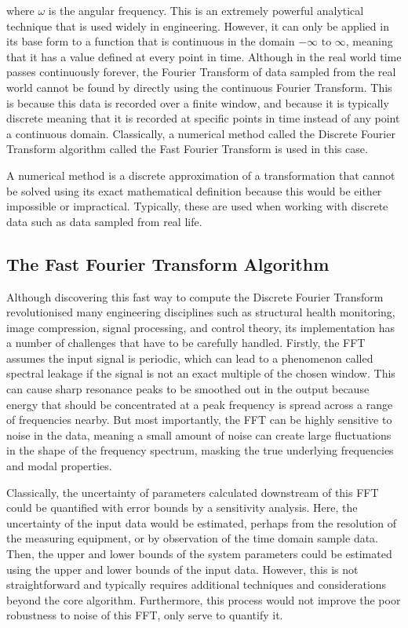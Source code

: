 \documentclass[12pt]{article}
\begin{document}
    where $\omega$ is the angular frequency.
    This is an extremely powerful analytical technique that is used widely in engineering.
    However, it can only be applied in its base form to a function that is continuous in the domain $-\infty \text{ to } \infty$, meaning that it has a value defined at every point in time.
    Although in the real world time passes continuously forever, the Fourier Transform of data sampled from the real world cannot be found by directly using the continuous Fourier Transform.
    This is because this data is recorded over a finite window, and because it is typically discrete meaning that it is recorded at specific points in time instead of any point a continuous domain.
    Classically, a numerical method called the Discrete Fourier Transform algorithm called the Fast Fourier Transform is used in this case.

    A numerical method is a discrete approximation of a transformation that cannot be solved using its exact mathematical definition because this would be either impossible or impractical.
    Typically, these are used when working with discrete data such as data sampled from real life.

    \subsection{The Fast Fourier Transform Algorithm}
    Although discovering this fast way to compute the Discrete Fourier Transform revolutionised many engineering disciplines such as structural health monitoring, image compression, signal processing, and control theory\cite{Byjus2023}, its implementation has a number of challenges that have to be carefully handled.
    Firstly, the FFT assumes the input signal is periodic, which can lead to a phenomenon called spectral leakage if the signal is not an exact multiple of the chosen window\cite{MathStackExchange2023}.
    This can cause sharp resonance peaks to be smoothed out in the output because energy that should be concentrated at a peak frequency is spread across a range of frequencies nearby.
    But most importantly, the FFT can be highly sensitive to noise in the data, meaning a small amount of noise can create large fluctuations in the shape of the frequency spectrum, masking the true underlying frequencies and modal properties\cite{MathStackExchange2023}.

    Classically, the uncertainty of parameters calculated downstream of this FFT could be quantified with error bounds by a sensitivity analysis.
    Here, the uncertainty of the input data would be estimated, perhaps from the resolution of the measuring equipment, or by observation of the time domain sample data.
    Then, the upper and lower bounds of the system parameters could be estimated using the upper and lower bounds of the input data.
    However, this is not straightforward and typically requires additional techniques and considerations beyond the core algorithm.
    Furthermore, this process would not improve the poor robustness to noise of this FFT, only serve to quantify it.
\end{document}

